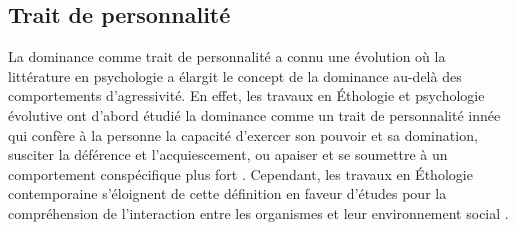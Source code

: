 %
%
%
%
%	
%
%
%
%


\subsection{Trait de personnalité}

La dominance comme trait de personnalité a connu une évolution où la littérature en psychologie a élargit le concept de la dominance au-delà des comportements d'agressivité.
En effet, les travaux en Éthologie et psychologie évolutive ont d'abord étudié la dominance comme un trait de personnalité innée qui confère à la personne la capacité d'exercer son pouvoir et sa domination, susciter la déférence et l'acquiescement, ou apaiser et se soumettre à un comportement conspécifique plus fort \cite{keltner1995signs,burgoon2006nonverbal}. Cependant, les travaux en Éthologie contemporaine s'éloignent de cette définition en faveur d'études pour la compréhension de l'interaction entre les organismes et leur environnement social \cite{burgoon2006nonverbal}.

